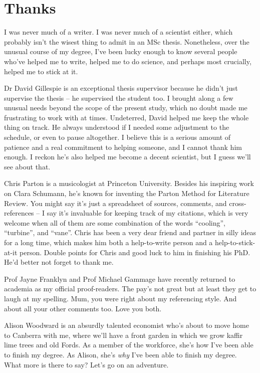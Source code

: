 \documentclass[a4paper, 11pt, oneside]{report}
\begin{document}
\chapter*{Thanks}


I was never much of a writer. I was never much of a scientist either, which probably isn't the wisest thing to admit in an MSc thesis. Nonetheless, over the unusual course of my degree, I've been lucky enough to know several people who've helped me to write, helped me to do science, and perhaps most crucially, helped me to stick at it.

Dr David Gillespie is an exceptional thesis supervisor because he didn't just supervise the thesis -- he supervised the student too. I brought along a few unusual needs beyond the scope of the present study, which no doubt made me frustrating to work with at times. Undeterred, David helped me keep the whole thing on track. He always understood if I needed some adjustment to the schedule, or even to pause altogether. I believe this is a serious amount of patience and a real commitment to helping someone, and I cannot thank him enough. I reckon he's also helped me become a decent scientist, but I guess we'll see about that.

Chris Parton is a musicologist at Princeton University. Besides his inspiring work on Clara Schumann, he's known for inventing the Parton Method for Literature Review. You might say it's just a spreadsheet of sources, comments, and cross-references -- I say it's invaluable for keeping track of my citations, which is very welcome when all of them are some combination of the words ``cooling'', ``turbine'', and ``vane''. Chris has been a very dear friend and partner in silly ideas for a long time, which makes him both a help-to-write person and a help-to-stick-at-it person. Double points for Chris and good luck to him in finishing his PhD. He'd better not forget to thank me.

Prof Jayne Franklyn and Prof Michael Gammage have recently returned to academia as my official proof-readers. The pay's not great but at least they get to laugh at my spelling. Mum, you were right about my referencing style. And about all your other comments too. Love you both.

Alison Woodward is an absurdly talented economist who's about to move home to Canberra with me, where we'll have a front garden in which we grow kaffir lime trees and old Fords. As a member of the workforce, she's how I've been able to finish my degree. As Alison, she's \textit{why} I've been able to finish my degree. What more is there to say? Let's go on an adventure.
\end{document}
